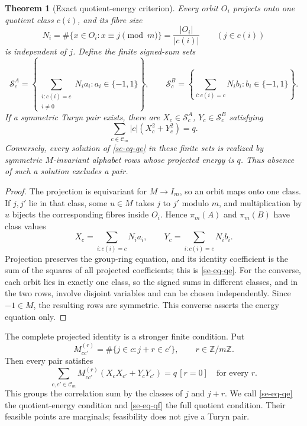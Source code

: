 \documentclass[11pt]{article}
\newtheorem{theorem}{Theorem}[section]
\theoremstyle{definition}
\theoremstyle{remark}
\begin{document}
\begin{theorem}[Exact quotient-energy criterion]
\label{se-thm-qe}
Every orbit $O_i$ projects onto one quotient class $c(i)$, and its fibre
size
\[
 N_i=\#\{x\in O_i:x\equiv j\pmod m\}=\frac{|O_i|}{|c(i)|}
 \qquad (j\in c(i))
\]
is independent of $j$.  Define the finite signed-sum sets
\[
 \mathcal S^A_c=
 \left\{\sum_{\substack{i:c(i)=c\\i\ne0}}N_i a_i:a_i\in\{-1,1\}\right\},
 \qquad
 \mathcal S^B_c=
 \left\{\sum_{i:c(i)=c}N_i b_i:b_i\in\{-1,1\}\right\}.
\]
If a symmetric Turyn pair exists, there are
$X_c\in\mathcal S^A_c$, $Y_c\in\mathcal S^B_c$ satisfying
\begin{equation}
 \sum_{c\in\mathcal C_m}|c|(X_c^2+Y_c^2)=q.
 \label{se-eq-qe}
\end{equation}
Conversely, every solution of \eqref{se-eq-qe} in these finite sets is
realized by symmetric $M$-invariant alphabet rows whose projected energy
is $q$.  Thus absence of such a solution excludes a pair.
\end{theorem}

\begin{proof}
The projection is equivariant for $M\to I_m$, so an orbit maps onto one
class.  If $j,j'$ lie in that class, some $u\in M$ takes $j$ to $j'$
modulo $m$, and multiplication by $u$ bijects the corresponding fibres
inside $O_i$.  Hence $\pi_m(A)$ and $\pi_m(B)$ have class values
\[
 X_c=\sum_{i:c(i)=c}N_i a_i,
 \qquad Y_c=\sum_{i:c(i)=c}N_i b_i.
\]
Projection preserves the group-ring equation, and its identity
coefficient is the sum of the squares of all projected coefficients;
this is \eqref{se-eq-qe}.  For the converse, each orbit lies in exactly
one class, so the signed sums in different classes, and in the two rows,
involve disjoint variables and can be chosen independently.  Since
$-1\in M$, the resulting rows are symmetric.  This converse asserts the
energy equation only.
\end{proof}

The complete projected identity is a stronger finite condition.  Put
\[
 M^{(r)}_{cc'}=\#\{j\in c:j+r\in c'\},\qquad r\in\mathbb Z/m\mathbb Z.
\]
Then every pair satisfies
\begin{equation}
 \sum_{c,c'\in\mathcal C_m}M^{(r)}_{cc'}
       (X_cX_{c'}+Y_cY_{c'})=q\,[r=0]
 \quad\text{for every }r.
 \label{se-eq-qf}
\end{equation}
This groups the correlation sum by the classes of $j$ and $j+r$.  We
call \eqref{se-eq-qe} the quotient-energy condition and
\eqref{se-eq-qf} the full quotient condition.  Their feasible points are
marginals; feasibility does not give a Turyn pair.
\end{document}
